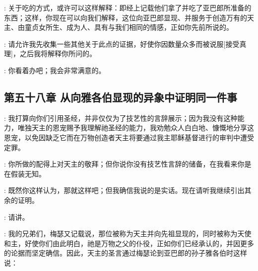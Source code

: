 : 关于吃的方式，或许可以这样解释：即经上记载他们拿了并吃了亚巴郎所准备的东西；这样，你现在可以向我们解释，这位向亚巴郎显现、并服务于创造万有的天主、由童贞女所生、成为人、具有与我们相同的情感，正如你先前所说的。\par

: 请允许我先收集一些其他关于此点的证据，好使你因数量众多而被说服[接受真理]，之后我将解释你所问的。\par

: 你看着办吧；我会非常满意的。\par


\subsection{第五十八章 从向雅各伯显现的异象中证明同一件事}

: 我打算向你们引用圣经，并非仅仅为了技艺性的言辞展示；因为我没有这种能力，唯独天主的恩宠赐予我理解祂圣经的能力，我劝勉众人白白地、慷慨地分享这恩宠，以免因缺乏它而在万物创造者天主将要通过我主耶稣基督进行的审判中遭受定罪。\par

: 你所做的配得上对天主的敬拜；但你说你没有技艺性言辞的储备，在我看来你是在假装无知。\par

: 既然你这样认为，那就这样吧；但我确信我说的是实话。现在请听我继续引出其余的证明。\par

: 请讲。\par

: 我的兄弟们，梅瑟又记载说，那位被称为天主并向先祖显现的，同时被称为天使和主，好使你们由此明白，祂是万物之父的仆役，正如你们已经承认的，并因更多的论据而坚定确信。因此，天主的圣言通过梅瑟论到亚巴郎的孙子雅各伯时这样说：\par

\par

